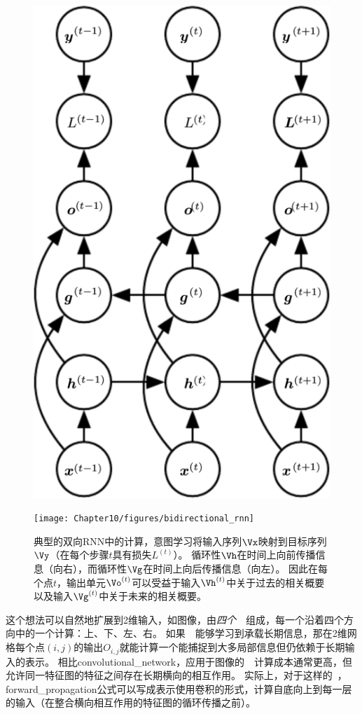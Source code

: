 \begin{figure}[!htb]
\ifOpenSource
\centerline{\includegraphics[scale=0.5]{images/99.png}}
\else
\centerline{\texttt{[image: Chapter10/figures/bidirectional\_rnn]}}
\fi
\caption{典型的双向\gls{RNN}中的计算，意图学习将输入序列$\Vx$映射到目标序列$\Vy$（在每个步骤$t$具有损失$L^{(t)}$）。
循环性$\Vh$在时间上向前传播信息（向右），而循环性$\Vg$在时间上向后传播信息（向左）。
因此在每个点$t$，输出单元$\Vo^{(t)}$可以受益于输入$\Vh^{(t)}$中关于过去的相关概要以及输入$\Vg^{(t)}$中关于未来的相关概要。
}
\label{fig:chap10_bidirectional_rnn}
\end{figure}

这个想法可以自然地扩展到2维输入，如图像，由\emph{四个}~~组成，每一个沿着四个方向中的一个计算：上、下、左、右。
如果~~能够学习到承载长期信息，那在2维网格每个点$(i, j)$的输出$O_{i,j}$就能计算一个能捕捉到大多局部信息但仍依赖于长期输入的表示。
相比\gls{convolutional_network}，应用于图像的~~计算成本通常更高，但允许同一特征图的特征之间存在长期横向的相互作用\citep{Visin-et-al-2015,Kalchbrenner-et-al-2015}。
实际上，对于这样的~，\gls{forward_propagation}公式可以写成表示使用卷积的形式，计算自底向上到每一层的输入（在整合横向相互作用的特征图的循环传播之前）。

